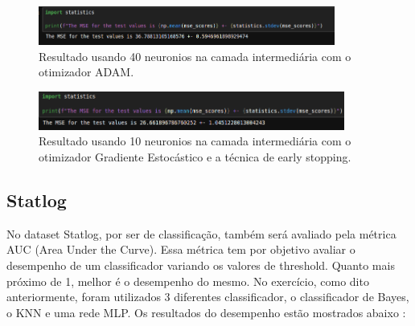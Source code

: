 \documentclass{article}
\begin{document}
\vspace{10pt}

\vspace{10pt}

\begin{figure}[h]

    \centering
    \includegraphics[height=0.5in]{best_reg.png}
    \caption{Resultado usando 40 neuronios na camada intermediária com o otimizador ADAM.}
    \label{fig:example}
    
\end{figure}

\vspace{10pt}


\vspace{10pt}

\begin{figure}[h]

    \centering
    \includegraphics[height=0.5in]{10_neuron.png}
    \caption{Resultado usando 10 neuronios na camada intermediária com o otimizador Gradiente Estocástico e a técnica de early stopping.}
    \label{fig:example}
    
\end{figure}

\vspace{10pt}

\subsection{Statlog}

\vspace{10pt}

No dataset Statlog, por ser de classificação, também será avaliado pela métrica AUC (Area Under the Curve). Essa métrica tem por objetivo avaliar o desempenho de um classificador variando os valores de threshold. Quanto mais próximo de 1, melhor é o desempenho do mesmo. No exercício, como dito anteriormente, foram utilizados 3 diferentes classificador, o classificador de Bayes, o KNN e uma rede MLP. Os resultados do desempenho estão mostrados abaixo :     

\vspace{10pt}
\end{document}
